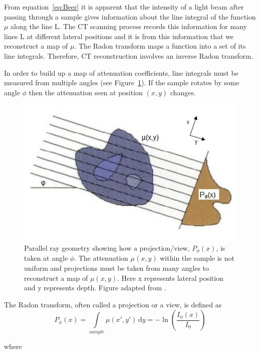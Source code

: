 \documentclass[12pt]{article}
\begin{document}
From equation~\ref{eq:Beer} it is apparent that  the  intensity of a light beam after passing through a sample gives information about the line integral of the function $\mu$  along the line L. The CT scanning process records this information for many lines L at different lateral positions and it is from this information that we reconstruct a map of $\mu$. \cite{natterer2001mathematics}
The Radon transform maps a function into a set of its line integrals. Therefore, CT reconstruction involves an inverse Radon transform.



In order to build up a map of attenuation coefficients, line integrals must be measured from multiple angles (see Figure~\ref{fig:projection}). If the sample rotates by some angle $\phi$ then the attenuation seen at position $(x, y)$  changes.

\begin{figure}[H]
\centering
\includegraphics[scale=0.8]{Russ_projection.jpg}
\caption{Parallel ray geometry showing how a projection/view, $P_{\phi}(x)$, is taken at angle $\phi$. The attenuation $\mu(x,y)$ within the sample is not uniform and projections must be taken from many angles to reconstruct a map of $\mu(x,y)$.  Here x represents lateral position  and y represents  depth. Figure adapted from \cite{russ2002image}.}
\label{fig:projection}
\end{figure}


The Radon transform, often called a projection or a view, is defined as
\begin{equation}
P_{\phi}(x) = \int\limits_{sample} \mu(x',y')\, \mathrm{d}y = -\ln\left(\frac{I_{\phi}(x)}{I_0}\right)
\end{equation}

where 
\end{document}
